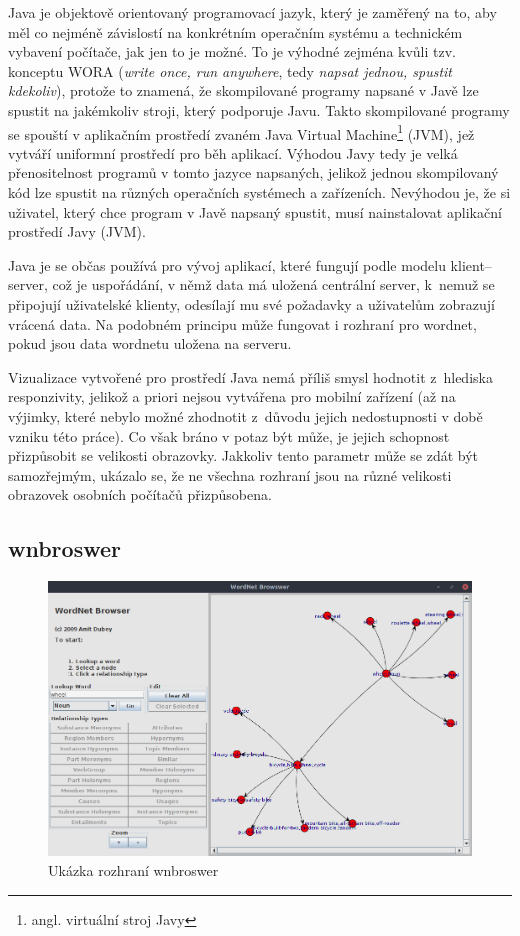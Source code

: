 \documentclass[a4paper, 11pt, oneside, showtrims]{book}
\begin{document}
				Java je objektově orientovaný programovací jazyk, který je zaměřený na to, aby měl co nejméně závislostí na konkrétním operačním systému a technickém vybavení počítače, jak jen to je možné. To je výhodné zejména kvůli tzv. konceptu WORA (\textit{write once, run anywhere}, tedy \textit{napsat jednou, spustit kdekoliv}), protože to znamená, že skompilované programy napsané v Javě lze spustit na jakémkoliv stroji, který podporuje Javu. Takto skompilované programy se spouští v aplikačním prostředí zvaném Java Virtual Machine\footnote{angl. virtuální stroj Javy} (JVM), jež vytváří uniformní prostředí pro běh aplikací. Výhodou Javy tedy je velká přenositelnost programů v tomto jazyce napsaných, jelikož jednou skompilovaný kód lze spustit na různých operačních systémech a zařízeních. Nevýhodou je, že si uživatel, který chce program v Javě napsaný spustit, musí nainstalovat aplikační prostředí Javy (JVM). 

				Java je se občas používá pro vývoj aplikací, které fungují podle modelu klient--server, což je uspořádání, v němž data má uložená centrální server, k~nemuž se připojují uživatelské klienty, odesílají mu své požadavky a uživatelům zobrazují vrácená data. \parencite[13]{gosling1995java} Na podobném principu může fungovat i rozhraní pro wordnet, pokud jsou data wordnetu uložena na serveru.

				Vizualizace vytvořené pro prostředí Java nemá příliš smysl hodnotit z~hlediska responzivity, jelikož a priori nejsou vytvářena pro mobilní zařízení (až na výjimky, které nebylo možné zhodnotit z~důvodu jejich nedostupnosti v době vzniku této práce). Co však bráno v potaz být může, je jejich schopnost přizpůsobit se velikosti obrazovky. Jakkoliv tento parametr může se zdát být samozřejmým, ukázalo se, že ne všechna rozhraní jsou na různé velikosti obrazovek osobních počítačů přizpůsobena.

				\subsection{wnbroswer}

					\begin{figure}[h]
						\centering
						\includegraphics[width=1.0\textwidth]{wnwordnetbrowswer.png}
						\caption{Ukázka rozhraní wnbroswer}
						\label{fig:wnwordnetbrowswer}
					\end{figure}
\end{document}
